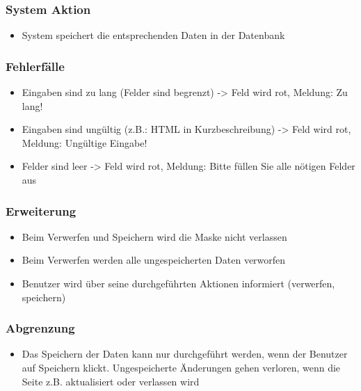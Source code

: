 \documentclass[a4paper,12pt]{article}
\begin{document}
\subsubsection{System Aktion}\label{system-aktion-3}

\begin{itemize}

\item
  System speichert die entsprechenden Daten in der Datenbank
\end{itemize}

\subsubsection{Fehlerfälle}\label{fehlerfalle-3}

\begin{itemize}

\item
  Eingaben sind zu lang (Felder sind begrenzt) -\textgreater{} Feld wird
  rot, Meldung: Zu lang!
\item
  Eingaben sind ungültig (z.B.: HTML in Kurzbeschreibung)
  -\textgreater{} Feld wird rot, Meldung: Ungültige Eingabe!
\item
  Felder sind leer -\textgreater{} Feld wird rot, Meldung: Bitte füllen
  Sie alle nötigen Felder aus
\end{itemize}

\subsubsection{Erweiterung}\label{erweiterung-3}

\begin{itemize}

\item
  Beim Verwerfen und Speichern wird die Maske nicht verlassen
\item
  Beim Verwerfen werden alle ungespeicherten Daten verworfen
\item
  Benutzer wird über seine durchgeführten Aktionen informiert
  (verwerfen, speichern)
\end{itemize}

\subsubsection{Abgrenzung}\label{abgrenzung-3}

\begin{itemize}

\item
  Das Speichern der Daten kann nur durchgeführt werden, wenn der
  Benutzer auf Speichern klickt. Ungespeicherte Änderungen gehen
  verloren, wenn die Seite z.B. aktualisiert oder verlassen wird
\end{itemize}
\end{document}
